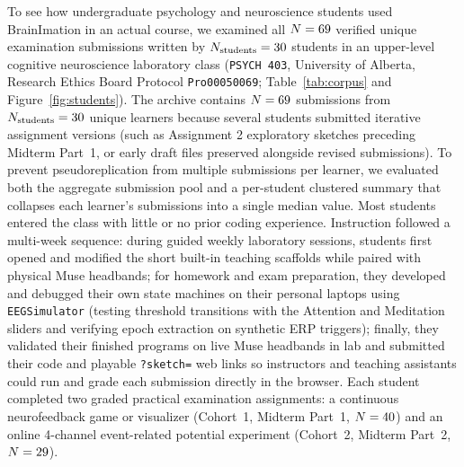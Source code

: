 \documentclass[11pt]{article}
\begin{document}
To see how undergraduate psychology and neuroscience students used BrainImation in an actual course, we examined all $N = 69$ verified unique examination submissions written by $N_{\text{students}} = 30$ students in an upper-level cognitive neuroscience laboratory class (\texttt{PSYCH 403}, University of Alberta, Research Ethics Board Protocol \texttt{Pro00050069}; Table~\ref{tab:corpus} and Figure~\ref{fig:students}). The archive contains $N = 69$ submissions from $N_{\text{students}} = 30$ unique learners because several students submitted iterative assignment versions (such as Assignment 2 exploratory sketches preceding Midterm Part~1, or early draft files preserved alongside revised submissions). To prevent pseudoreplication from multiple submissions per learner, we evaluated both the aggregate submission pool and a per-student clustered summary that collapses each learner's submissions into a single median value. Most students entered the class with little or no prior coding experience. Instruction followed a multi-week sequence: during guided weekly laboratory sessions, students first opened and modified the short built-in teaching scaffolds while paired with physical Muse headbands; for homework and exam preparation, they developed and debugged their own state machines on their personal laptops using \texttt{EEGSimulator} (testing threshold transitions with the Attention and Meditation sliders and verifying epoch extraction on synthetic ERP triggers); finally, they validated their finished programs on live Muse headbands in lab and submitted their code and playable \texttt{?sketch=} web links so instructors and teaching assistants could run and grade each submission directly in the browser. Each student completed two graded practical examination assignments: a continuous neurofeedback game or visualizer (Cohort~1, Midterm Part~1, $N = 40$) and an online 4-channel event-related potential experiment (Cohort~2, Midterm Part~2, $N = 29$).
\end{document}
